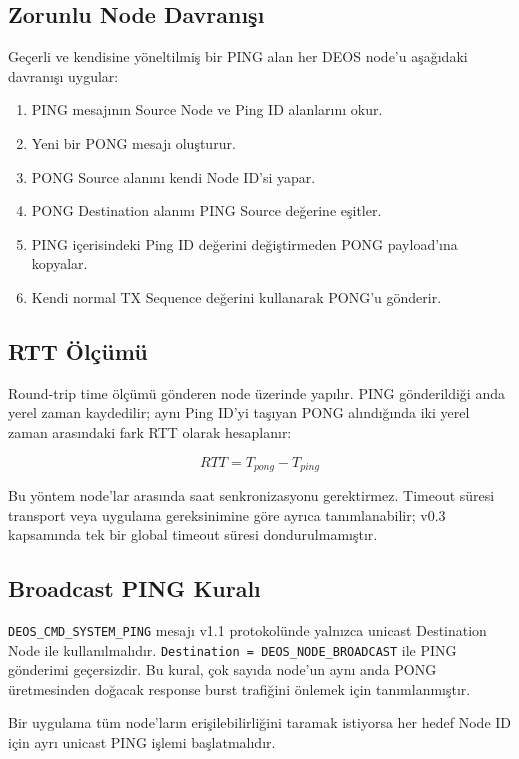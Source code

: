 \documentclass[a4paper,10pt]{article}
\newcommand{\code}[1]{\texttt{#1}}
\begin{document}
\subsection{Zorunlu Node Davranışı}

Geçerli ve kendisine yöneltilmiş bir PING alan her DEOS node'u aşağıdaki davranışı uygular:

\begin{enumerate}[nosep]
    \item PING mesajının Source Node ve Ping ID alanlarını okur.
    \item Yeni bir PONG mesajı oluşturur.
    \item PONG Source alanını kendi Node ID'si yapar.
    \item PONG Destination alanını PING Source değerine eşitler.
    \item PING içerisindeki Ping ID değerini değiştirmeden PONG payload'ına kopyalar.
    \item Kendi normal TX Sequence değerini kullanarak PONG'u gönderir.
\end{enumerate}

\subsection{RTT Ölçümü}

Round-trip time ölçümü gönderen node üzerinde yapılır. PING gönderildiği anda yerel zaman
kaydedilir; aynı Ping ID'yi taşıyan PONG alındığında iki yerel zaman arasındaki fark RTT
olarak hesaplanır:

\[
RTT = T_{pong} - T_{ping}
\]

Bu yöntem node'lar arasında saat senkronizasyonu gerektirmez. Timeout süresi transport veya
uygulama gereksinimine göre ayrıca tanımlanabilir; v0.3 kapsamında tek bir global timeout
süresi dondurulmamıştır.

\subsection{Broadcast PING Kuralı}

\code{DEOS\_CMD\_SYSTEM\_PING} mesajı v1.1 protokolünde yalnızca unicast Destination Node
ile kullanılmalıdır. \code{Destination = DEOS\_NODE\_BROADCAST} ile PING gönderimi geçersizdir.
Bu kural, çok sayıda node'un aynı anda PONG üretmesinden doğacak response burst trafiğini
önlemek için tanımlanmıştır.

Bir uygulama tüm node'ların erişilebilirliğini taramak istiyorsa her hedef Node ID için ayrı
unicast PING işlemi başlatmalıdır.
\end{document}
